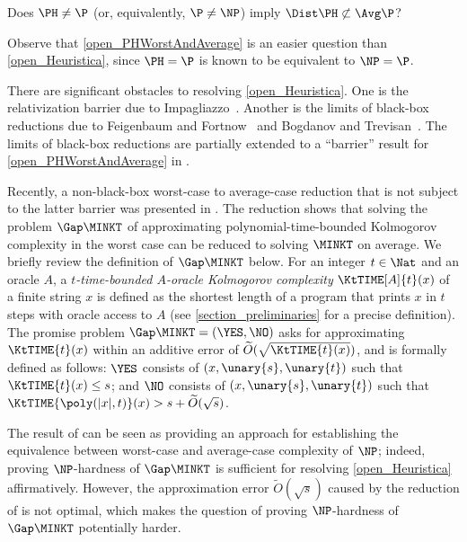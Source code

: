 \documentclass[11pt]{article}
\numberwithin{equation}{section}
\theoremstyle{definition}
\theoremstyle{plain}
\begin{document}
\begin{open}
  \label{open_PHWorstAndAverage}
  Does $\PH \neq \P$ (or, equivalently, $\P \neq \NP$)
  imply
  $\Dist\PH \not\subset \Avg\P$?
\end{open}
Observe that \cref{open_PHWorstAndAverage} is an easier question than \cref{open_Heuristica}, since $\PH = \P$ is known to be equivalent to $\NP = \P$.

There are significant obstacles %
to  %
resolving  %
%
\cref{open_Heuristica}.
One is the relativization barrier due to Impagliazzo~\cite{Impagliazzo11_coco_conf}.  Another is the limits of black-box reductions
due to Feigenbaum and Fortnow~\cite{FeigenbaumF93_siamcomp_journals} and Bogdanov and Trevisan~\cite{BogdanovT06_siamcomp_journals}.
The limits of black-box reductions are partially extended to a ``barrier'' result
for \cref{open_PHWorstAndAverage}
in \cite{HiraharaW20_approx_conf}.

Recently, a non-black-box worst-case to average-case reduction
that is not subject to the latter barrier
was presented in \cite{Hirahara18_focs_conf}.
The reduction shows that solving
the problem $\Gap\MINKT$ of
approximating polynomial-time-bounded Kolmogorov complexity
in the worst case
can be reduced to solving $\MINKT$ on average.
We briefly review the definition of $\Gap\MINKT$ below.
For an integer $t \in \Nat$ and an oracle $A$,
a \emph{$t$-time-bounded $A$-oracle Kolmogorov complexity} $\KtTIME[A]{t}(x)$ of a finite string $x$
is defined as
the shortest length of a program that prints $x$ in $t$ steps
with oracle access to $A$ (see \cref{section_preliminaries} for a precise definition).
The promise problem $\Gap\MINKT = (\YES, \NO)$
%
asks for approximating $\KtTIME{t}(x)$ within an additive error of
$\widetilde{O}(\sqrt{\KtTIME{t}(x)})$,
and is formally defined as follows:
$\YES$ consists of $(x, \unary{s}, \unary{t})$ such that $\KtTIME{t}(x) \le s$;
and
$\NO$ consists of $(x, \unary{s}, \unary{t})$ such that $\KtTIME{\poly(|x|, t)}(x) > s + \widetilde{O}(\sqrt{s})$.

The result of \cite{Hirahara18_focs_conf}
can be seen as providing an approach for establishing the equivalence between worst-case and average-case complexity of $\NP$;
indeed,
proving $\NP$-hardness of $\Gap\MINKT$ is sufficient for resolving \cref{open_Heuristica} affirmatively.  %
However, the approximation error $\widetilde{O}(\sqrt{s})$ caused by the reduction of \cite{Hirahara18_focs_conf} is not optimal,
which makes the question of proving $\NP$-hardness of $\Gap\MINKT$ potentially harder.
%
\end{document}
